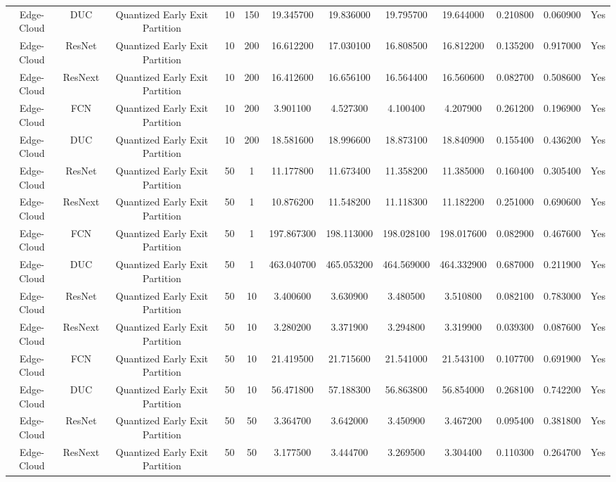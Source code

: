 \begin{tabular}{|c||c||c||c||c||c||c||c||c||c||c||c|}
Edge-Cloud & DUC & Quantized Early Exit Partition & 10 & 150 & 19.345700 & 19.836000 & 19.795700 & 19.644000 & 0.210800 & 0.060900 & Yes \\
Edge-Cloud & ResNet & Quantized Early Exit Partition & 10 & 200 & 16.612200 & 17.030100 & 16.808500 & 16.812200 & 0.135200 & 0.917000 & Yes \\
Edge-Cloud & ResNext & Quantized Early Exit Partition & 10 & 200 & 16.412600 & 16.656100 & 16.564400 & 16.560600 & 0.082700 & 0.508600 & Yes \\
Edge-Cloud & FCN & Quantized Early Exit Partition & 10 & 200 & 3.901100 & 4.527300 & 4.100400 & 4.207900 & 0.261200 & 0.196900 & Yes \\
Edge-Cloud & DUC & Quantized Early Exit Partition & 10 & 200 & 18.581600 & 18.996600 & 18.873100 & 18.840900 & 0.155400 & 0.436200 & Yes \\
Edge-Cloud & ResNet & Quantized Early Exit Partition & 50 & 1 & 11.177800 & 11.673400 & 11.358200 & 11.385000 & 0.160400 & 0.305400 & Yes \\
Edge-Cloud & ResNext & Quantized Early Exit Partition & 50 & 1 & 10.876200 & 11.548200 & 11.118300 & 11.182200 & 0.251000 & 0.690600 & Yes \\
Edge-Cloud & FCN & Quantized Early Exit Partition & 50 & 1 & 197.867300 & 198.113000 & 198.028100 & 198.017600 & 0.082900 & 0.467600 & Yes \\
Edge-Cloud & DUC & Quantized Early Exit Partition & 50 & 1 & 463.040700 & 465.053200 & 464.569000 & 464.332900 & 0.687000 & 0.211900 & Yes \\
Edge-Cloud & ResNet & Quantized Early Exit Partition & 50 & 10 & 3.400600 & 3.630900 & 3.480500 & 3.510800 & 0.082100 & 0.783000 & Yes \\
Edge-Cloud & ResNext & Quantized Early Exit Partition & 50 & 10 & 3.280200 & 3.371900 & 3.294800 & 3.319900 & 0.039300 & 0.087600 & Yes \\
Edge-Cloud & FCN & Quantized Early Exit Partition & 50 & 10 & 21.419500 & 21.715600 & 21.541000 & 21.543100 & 0.107700 & 0.691900 & Yes \\
Edge-Cloud & DUC & Quantized Early Exit Partition & 50 & 10 & 56.471800 & 57.188300 & 56.863800 & 56.854000 & 0.268100 & 0.742200 & Yes \\
Edge-Cloud & ResNet & Quantized Early Exit Partition & 50 & 50 & 3.364700 & 3.642000 & 3.450900 & 3.467200 & 0.095400 & 0.381800 & Yes \\
Edge-Cloud & ResNext & Quantized Early Exit Partition & 50 & 50 & 3.177500 & 3.444700 & 3.269500 & 3.304400 & 0.110300 & 0.264700 & Yes \\

\end{tabular}
